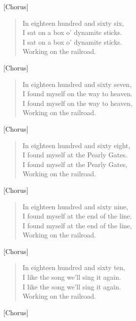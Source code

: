 [Chorus]

\begin{verse}
In eighteen hundred and sixty six, \\
I sat on a box o' dynamite sticks. \\
I sat on a box o' dynamite sticks. \\
Working on the railroad. \\
\end{verse}

[Chorus]

\begin{verse}
In eighteen hundred and sixty seven, \\
I found myself on the way to heaven. \\
I found myself on the way to heaven, \\
Working on the railroad. \\
\end{verse}

[Chorus]

\begin{verse}
In eighteen hundred and sixty eight, \\
I found myself at the Pearly Gates. \\
I found myself at the Pearly Gates, \\
Working on the railroad. \\
\end{verse}

[Chorus]

\begin{verse}
In eighteen hundred and sixty nine, \\
I found myself at the end of the line. \\
I found myself at the end of the line, \\
Working on the railroad. \\
\end{verse}

[Chorus]

\begin{verse}
In eighteen hundred and sixty ten, \\
I like the song we'll sing it again. \\
I like the song we'll sing it again. \\
Working on the railroad. \\
\end{verse}

[Chorus]
